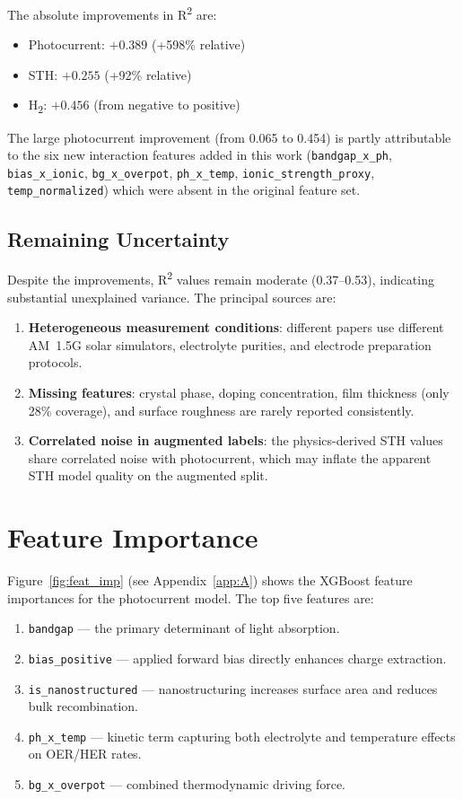 The absolute improvements in R\textsuperscript{2} are:
\begin{itemize}
  \item Photocurrent: $+0.389$ (+598\% relative)
  \item STH: $+0.255$ (+92\% relative)
  \item H\textsubscript{2}: $+0.456$ (from negative to positive)
\end{itemize}

The large photocurrent improvement (from 0.065 to 0.454) is partly attributable
to the six new interaction features added in this work
(\texttt{bandgap\_x\_ph}, \texttt{bias\_x\_ionic}, \texttt{bg\_x\_overpot},
\texttt{ph\_x\_temp}, \texttt{ionic\_strength\_proxy}, \texttt{temp\_normalized})
which were absent in the original feature set.

\subsection{Remaining Uncertainty}

Despite the improvements, R\textsuperscript{2} values remain moderate (0.37--0.53),
indicating substantial unexplained variance.
The principal sources are:
\begin{enumerate}
  \item \textbf{Heterogeneous measurement conditions}: different papers use
        different AM~1.5G solar simulators, electrolyte purities, and
        electrode preparation protocols.
  \item \textbf{Missing features}: crystal phase, doping concentration,
        film thickness (only 28\% coverage), and surface roughness are
        rarely reported consistently.
  \item \textbf{Correlated noise in augmented labels}: the physics-derived
        STH values share correlated noise with photocurrent, which may
        inflate the apparent STH model quality on the augmented split.
\end{enumerate}

\section{Feature Importance}

Figure~\ref{fig:feat_imp} (see Appendix~\ref{app:A}) shows the XGBoost feature
importances for the photocurrent model.
The top five features are:
\begin{enumerate}
  \item \texttt{bandgap} — the primary determinant of light absorption.
  \item \texttt{bias\_positive} — applied forward bias directly enhances charge
        extraction.
  \item \texttt{is\_nanostructured} — nanostructuring increases surface area and
        reduces bulk recombination.
  \item \texttt{ph\_x\_temp} — kinetic term capturing both electrolyte
        and temperature effects on OER/HER rates.
  \item \texttt{bg\_x\_overpot} — combined thermodynamic driving force.
\end{enumerate}

